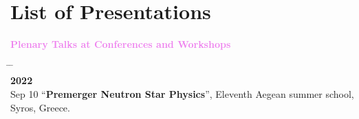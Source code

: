 \documentclass[10pt,floatfix,a4paper]{article}
\begin{document}
\section*{List of Presentations}
\hspace*{4mm}
{\large \bf \textcolor{Violet}{Plenary Talks at Conferences and Workshops}}
\begin{tabbing}
  \hspace*{5mm} \= \hspace*{2cm} \= \hspace*{10cm} \\[-3ex]
  \> {\bf 2022} \> \\[1ex]
  \> Sep 10 \> ``\textbf{Premerger Neutron Star Physics}'', Eleventh Aegean summer school, Syros, Greece.
\end{tabbing}
\end{document}
